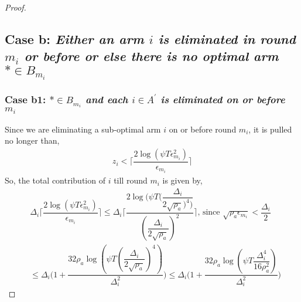 \begin{proof}

% 



\subsection*{Case b: \textit{Either an arm ${i}$ is eliminated in round $m_{i}$ or before or else there is no optimal arm ${*}\in B_{m_{i}}$ }}

\subsubsection*{Case b1: \textit{${*}\in B_{m_{i}}$ and each ${i}\in A^{'}$ is  eliminated on or before $m_{i}$ } }

 Since we are eliminating a sub-optimal arm ${i}$ on or before round $m_{i}$, it is pulled no longer than, 
 \begin{align*}
 z_{i} < \bigg\lceil\dfrac{2\log{(\psi T\epsilon_{m_{i}}^{2})}}{\epsilon_{m_{i}}}\bigg\rceil
 \end{align*}
So, the total contribution of ${i}$  till round $m_{i}$ is given by, 
\begin{align*}
&\Delta_{i}\bigg\lceil\dfrac{2\log{(\psi T\epsilon_{m_{i}}^{2})}}{\epsilon_{m_{i}}}\bigg\rceil
\leq\Delta_{i}\bigg\lceil\dfrac{2\log{(\psi T(\dfrac{\Delta_{i}}{2\sqrt{\rho_{a}})^{4})}}}{(\dfrac{\Delta_{i}}{2\sqrt{\rho_{a}}})^{2}}\bigg\rceil \text{, since } \sqrt{\rho_{a}\epsilon_{m_{i}}} < \dfrac{\Delta_{i}}{2}\\
&\leq\Delta_{i}\bigg(1+\dfrac{32\rho_{a}\log{(\psi T(\dfrac{\Delta_{i}}{2\sqrt{\rho_{a}}})^{4})}}{\Delta_{i}^{2}}\bigg)
\leq\Delta_{i}\bigg(1+\dfrac{32\rho_{a}\log{(\psi T\dfrac{\Delta_{i}^{4}}{16\rho_{a}^{2}})}}{\Delta_{i}^{2}}\bigg)
\end{align*} 
 

\end{proof}
